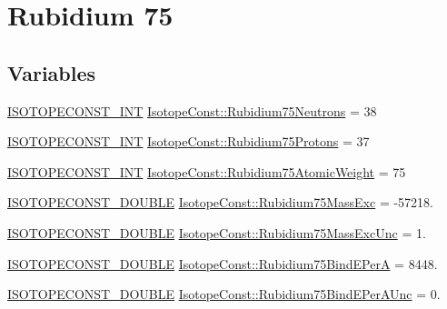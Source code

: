 \hypertarget{group___isotope_const-_rubidium-_rb75}{}\section{Rubidium 75}
\label{group___isotope_const-_rubidium-_rb75}
\subsection*{Variables}
\begin{DoxyCompactItemize}
\item 
\mbox{\hyperlink{group___isotope_const-_macros_ga5f18360b3e99483a35c32d789e62621c}{I\+S\+O\+T\+O\+P\+E\+C\+O\+N\+S\+T\+\_\+\+I\+NT}} \mbox{\hyperlink{group___isotope_const-_rubidium-_rb75_gadfdcc36f3a8de2e24f0dafee0d5af590}{Isotope\+Const\+::\+Rubidium75\+Neutrons}} = 38
\item 
\mbox{\hyperlink{group___isotope_const-_macros_ga5f18360b3e99483a35c32d789e62621c}{I\+S\+O\+T\+O\+P\+E\+C\+O\+N\+S\+T\+\_\+\+I\+NT}} \mbox{\hyperlink{group___isotope_const-_rubidium-_rb75_ga1af95af02ed1ce58e0c383bc6687ed6f}{Isotope\+Const\+::\+Rubidium75\+Protons}} = 37
\item 
\mbox{\hyperlink{group___isotope_const-_macros_ga5f18360b3e99483a35c32d789e62621c}{I\+S\+O\+T\+O\+P\+E\+C\+O\+N\+S\+T\+\_\+\+I\+NT}} \mbox{\hyperlink{group___isotope_const-_rubidium-_rb75_ga2136e475671f733bd293616e4f1f0069}{Isotope\+Const\+::\+Rubidium75\+Atomic\+Weight}} = 75
\item 
\mbox{\hyperlink{group___isotope_const-_macros_ga8f45a7272ce02c0b4c65c44636ed719a}{I\+S\+O\+T\+O\+P\+E\+C\+O\+N\+S\+T\+\_\+\+D\+O\+U\+B\+LE}} \mbox{\hyperlink{group___isotope_const-_rubidium-_rb75_ga3a48d75e788ea73336c6857b3d08c4c7}{Isotope\+Const\+::\+Rubidium75\+Mass\+Exc}} = -\/57218.
\item 
\mbox{\hyperlink{group___isotope_const-_macros_ga8f45a7272ce02c0b4c65c44636ed719a}{I\+S\+O\+T\+O\+P\+E\+C\+O\+N\+S\+T\+\_\+\+D\+O\+U\+B\+LE}} \mbox{\hyperlink{group___isotope_const-_rubidium-_rb75_gae0e3000becc84787559d2ead66a39438}{Isotope\+Const\+::\+Rubidium75\+Mass\+Exc\+Unc}} = 1.
\item 
\mbox{\hyperlink{group___isotope_const-_macros_ga8f45a7272ce02c0b4c65c44636ed719a}{I\+S\+O\+T\+O\+P\+E\+C\+O\+N\+S\+T\+\_\+\+D\+O\+U\+B\+LE}} \mbox{\hyperlink{group___isotope_const-_rubidium-_rb75_ga40947edea72f79487f3991cee13cb61a}{Isotope\+Const\+::\+Rubidium75\+Bind\+E\+PerA}} = 8448.
\item 
\mbox{\hyperlink{group___isotope_const-_macros_ga8f45a7272ce02c0b4c65c44636ed719a}{I\+S\+O\+T\+O\+P\+E\+C\+O\+N\+S\+T\+\_\+\+D\+O\+U\+B\+LE}} \mbox{\hyperlink{group___isotope_const-_rubidium-_rb75_ga484916cd32dd8b252e682e7076b0d44d}{Isotope\+Const\+::\+Rubidium75\+Bind\+E\+Per\+A\+Unc}} = 0.

\end{DoxyCompactItemize}
